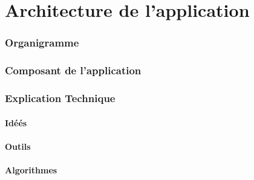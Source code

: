 \part{Architecture de l'application} %
\label{prt:architecture_ _de_ _l_'_application_}
	\section{Organigramme} %
	\label{sec:organigramme}
	

	\section{Composant de l'application} %
	\label{sec:composant_de_l_application}
	

	\section{Explication Technique} %
	\label{sec:explication_technique}
		
		\subsection{Idéés} %
		\label{sub:idéés}

		
		\subsection{Outils} %
		\label{sub:outils}
		
		\subsection{Algorithmes} %
		\label{sub:algorithmes}
		
